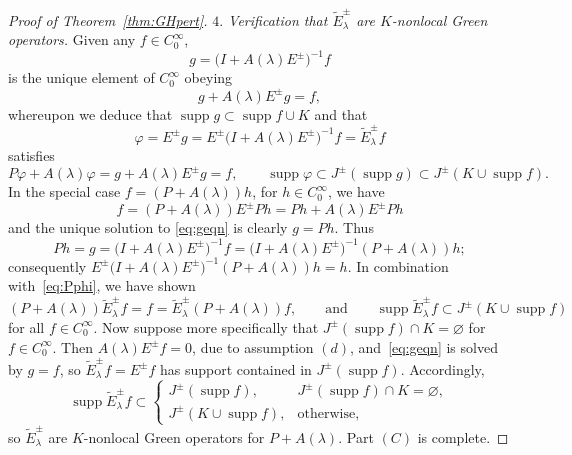 \documentclass[pdftex]{sigma}
\numberwithin{equation}{section}
\DeclareMathOperator{\supp}{supp}
\begin{document}
\begin{proof}[Proof of Theorem~\ref{thm:GHpert}]
 	\emph{$4.$ Verification that $\tilde{E}^\pm_\lambda$ are $K$-nonlocal Green operators.}
 	Given any $f\in C_0^\infty$,
 	\begin{equation*}
 		g=\big(I+ A(\lambda)E^\pm\big)^{-1} f
 	\end{equation*}
 	is the unique element of $C_0^\infty$ obeying
 	\begin{equation}\label{eq:geqn}
 		g + A(\lambda) E^\pm g= f,
 	\end{equation}
 	whereupon we deduce that $\supp g\subset \supp f \cup K$ and that
 	\begin{equation*}
 		\varphi = E^\pm g = E^\pm \big(I+ A(\lambda)E^\pm\big)^{-1} f = \tilde{E}^\pm_\lambda f
 	\end{equation*}
 	satisfies
 	\begin{equation}\label{eq:Pphi}
 		P\varphi + A(\lambda)\varphi = g+A(\lambda)E^\pm g=f, \qquad \supp \varphi\subset J^\pm(\supp g) \subset J^\pm(K\cup \supp f).
 	\end{equation}
 	In the special case $f=(P+A(\lambda))h$, for $h\in C_0^\infty$,
 	we have
 	\begin{equation*}
 		f = (P+ A(\lambda))E^\pm P h=Ph + A(\lambda) E^\pm Ph
 	\end{equation*}
 	and the unique solution to \eqref{eq:geqn} is clearly $g=Ph$. Thus
 	\begin{equation*}
 		Ph=g=\big(I+ A(\lambda)E^\pm\big)^{-1}f =\big(I+ A(\lambda)E^\pm\big)^{-1}(P+ A(\lambda))h;
 	\end{equation*}
 	consequently $E^\pm \big(I+ A(\lambda)E^\pm\big)^{-1} (P+ A(\lambda))h = h$.
 	In combination with~\eqref{eq:Pphi}, we have shown
 	\begin{equation*}
 		(P+ A(\lambda))\tilde{E}^\pm_\lambda f=f = \tilde{E}^\pm_\lambda (P+ A(\lambda)) f,\qquad\text{and}\qquad
 		\supp\tilde{E}^\pm_\lambda f\subset J^\pm(K\cup \supp f)
 	\end{equation*}
 	for all $f\in C_0^\infty$.
 	Now suppose more specifically that $J^\pm(\supp f)\cap K=\varnothing$ for $f\in C^\infty_0$. Then $A(\lambda)E^\pm f=0$, due to assumption $(d)$, and~\eqref{eq:geqn} is solved by $g=f$, so
 	$\tilde{E}^\pm_\lambda f=E^\pm f$ has support contained in $J^\pm(\supp f)$. Accordingly,
 	\begin{equation*}
 		\supp\tilde{E}^\pm_\lambda f\subset
 		\begin{cases}
 			J^\pm(\supp f), & J^\pm(\supp f)\cap K=\varnothing ,\\
 			J^\pm(K\cup \supp f), & \text{otherwise,}
 		\end{cases}
 	\end{equation*}
 	so $\tilde{E}^\pm_\lambda$ are $K$-nonlocal Green operators for $P+ A(\lambda)$. Part $(C)$ is complete.
 	

\end{proof}
\end{document}
